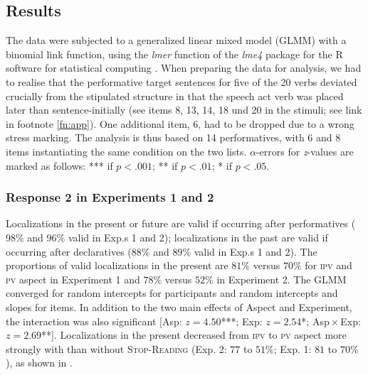 \documentclass[output=paper,
colorlinks,
citecolor=brown,
newtxmath,
hidelinks
]{langscibook}
\begin{document}
\subsection{Results}

The data were subjected to a generalized linear mixed model (GLMM) with a binomial link function, using the \textit{lmer} function of the \textit{lme4} package \citep{Bates2015} for the R software for statistical computing \citep{team2014r}.
When preparing the data for analysis, we had to realise that the performative target sentences for five of the 20 verbs deviated crucially from the stipulated structure in that the speech act verb was placed later than sentence-initially (see items 8, 13, 14, 18 und 20 in the stimuli; see link in footnote \ref{fn:app}). One additional item, 6, had to be dropped due to a wrong stress marking. The analysis is thus based on 14 performatives, with 6 and 8 items instantiating the same condition on the two lists. $\alpha$-errors for \textit{z}-values are marked as follows: \textup{***} if $p<.001$; \textup{**} if $p<.01$; \textup{*} if $p < .05$.

\subsubsection{Response 2 in Experiments 1 and 2}
Localizations in the present or future are valid if occurring after performatives ($98\%$ and $96\%$ valid in Exp.s 1 and 2); localizations in the past are valid if occurring after declaratives ($88\%$ and $89\%$ valid in Exp.s 1 and 2). The proportions of valid localizations in the present are $81\%$ versus $70\%$ for \textsc{ipv} and \textsc{pv} aspect in Experiment 1 and $78\%$ versus $52\%$ in Experiment 2. The GLMM converged for random intercepts for participants and random intercepts and slopes for items. In addition to the two main effects of Aspect and Experiment, the interaction was also significant [Asp: $z=4.50$\textup{***}; Exp: $z=2.54$\textup{*}; Asp${}\times{}$Exp: $z=2.69$\textup{**}]. Localizations in the present decreased from \textsc{ipv} to \textsc{pv} aspect more strongly with than without \textsc{Stop-Reading} (Exp. 2: $77$ to $51\%$; Exp. 1: $81$ to $70\%$), as shown in .
\end{document}

